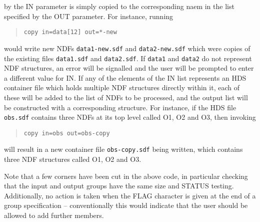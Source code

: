 \documentclass[twoside,11pt]{article}
\renewcommand{\_}{\texttt{\symbol{95}}}
\begin{document}
by the IN parameter is simply copied to the corresponding naem in the 
list specified by the OUT parameter.  For instance, running
\begin{quote}
\latexonly{\small}
\begin{verbatim}
copy in=data[12] out=*-new
\end{verbatim}
\end{quote}
would write new NDFs {\tt data1-new.sdf} and {\tt data2-new.sdf}
which were copies of the existing files {\tt data1.sdf} and {\tt data2.sdf}.
If {\tt data1} and {\tt data2} do not represent NDF structures,
an error will be signalled and the user will be prompted to enter
a different value for IN.
If any of the elements of the IN list represents an HDS container file
which holds multiple NDF structures directly within it, each of these
will be added to the list of NDFs to be processed, and the
output list will be constructed with a corresponding structure.
For instance, if the HDS file {\tt obs.sdf} contains three NDFs at
its top level called O1, O2 and O3, then invoking
\begin{quote}
\latexonly{\small}
\begin{verbatim}
copy in=obs out=obs-copy
\end{verbatim}
\end{quote}
will result in a new container file {\tt obs-copy.sdf} being written, 
which contains three NDF structures called O1, O2 and O3.

Note that a few corners have been cut in the above code,
in particular checking that the input and output groups have the
same size and STATUS testing.  Additionally, no action is taken
when the FLAG character is given at the end of a group specification --
conventionally this would indicate that the user should be allowed
to add further members.

\appendix
\end{document}
